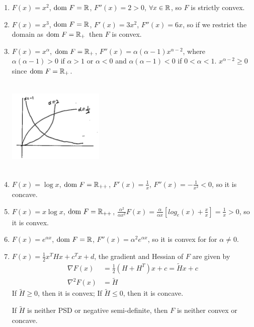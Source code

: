 \begin{enumerate}
	\item $F(x) = x^2$, $\text{dom}\ F = \mathbb{R}$, $F''(x) = 2 > 0$, $\forall x\in \mathbb{R}$, so $F$ is strictly convex.
	
	\item $F(x) = x^3$, $\text{dom}\ F = \mathbb{R}$, $F'(x) = 3x^2$, $F''(x) = 6x$, so if we restrict the domain as $\text{dom}\ F = \mathbb{R}_+$ then $F$ is convex.
	
	\item $F(x) = x^{\alpha}$, $\text{dom}\ F = \mathbb{R}_+$, $F''(x) = \alpha(\alpha - 1)x^{\alpha - 2}$, where $\alpha(\alpha - 1) > 0$ if $\alpha > 1$ or $\alpha < 0$ and $\alpha(\alpha - 1) < 0$ if $0<\alpha < 1$. $x^{\alpha - 2}\geq 0$ since $\text{dom}\ F = \mathbb{R}_+$.
	
	\begin{marginfigure}
	\centering
	\includegraphics[width=1.8in,height=1.8in]{figures/ch08/figure1106_4.png}
	\end{marginfigure}
	
	\item $F(x) = \log x$, $\text{dom}\ F = \mathbb{R}_{++}$, $F'(x) = \frac{1}{x}$, $F''(x) = -\frac{1}{x^2}<0$, so it is concave.
	
	\item $F(x) = x\log x$, $\text{dom}\ F = \mathbb{R}_{++}$, $\frac{\alpha^2}{\alpha x^2}F(x) = \frac{\alpha}{\alpha x}[log_e(x) + \frac{x}{x}] = \frac{1}{x} > 0$, so it is convex.
	
	\item $F(x) = e^{\alpha x}$, $\text{dom}\ F = \mathbb{R}$, $F''(x) = \alpha^2 e^{\alpha x}$, so it is convex for for $\alpha\neq 0$.
	
	\item $F(x) = \frac{1}{2}x^THx + c^Tx + d$, the gradient and Hessian of $F$ are given by
	\begin{align*}
	\nabla F(x) &= \frac{1}{2}(H+H^T)x + c = \tilde{H}x + c\\
	\nabla^2F(x) &= \tilde{H}
	\end{align*}
	If $\tilde{H}\geq 0$, then it is convex; If $\tilde{H}\leq 0$, then it is concave.
	
	If $\tilde{H}$ is neither PSD or negative semi-definite, then $F$ is neither convex or concave.
\end{enumerate}

